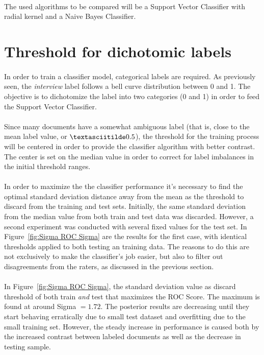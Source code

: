 \documentclass[12pt,a4paper]{report}
\begin{document}
\paragraph{} The used algorithms to be compared will be a Support Vector Classifier with radial kernel and a Naive Bayes Classifier.

\section{Threshold for dichotomic labels}

\paragraph{} In order to train a classifier model, categorical labels are required. As previously seen, the \emph{interview} label follows a bell curve distribution between 0 and 1. The objective is to dichotomize the label into two categories (0 and 1) in order to feed the Support Vector Classifier.

\paragraph{} Since many documents have a somewhat ambiguous label (that is, close to the mean label value, or $\textasciitilde 0.5$), the threshold for the training process will be centered in order to provide the classifier algorithm with better contrast. The center is set on the median value in order to correct for label imbalances in the initial threshold ranges.

\paragraph{} In order to maximize the the classifier performance it's necessary to find the optimal standard deviation distance away from the mean as the threshold to discard from the training and test sets. Initially, the same standard deviation from the median value from both train and test data was discarded. However, a second experiment was conducted with several fixed values for the test set. In Figure~\ref{fig:Sigma ROC Sigma} are the results for the first case, with identical thresholds applied to both testing an training data. The reasons to do this are not exclusively to make the classifier's job easier, but also to filter out disagreements from the raters, as discussed in the previous section.

\paragraph{} In Figure~\ref{fig:Sigma ROC Sigma}, the standard deviation value as discard threshold of both train \emph{and} test that maximizes the ROC Score. The maximum is found at around Sigma $= 1.72$. The posterior results are decreasing until they start behaving erratically due to small test dataset and overfitting due to the small training set. However, the steady increase in performance is caused both by the increased contrast between labeled documents as well as the decrease in testing sample.
\end{document}
